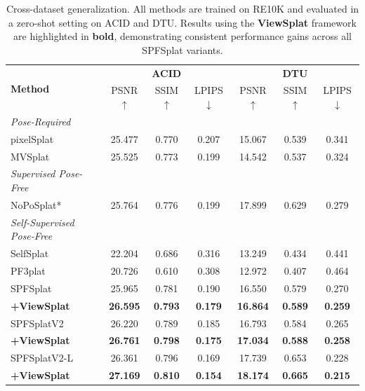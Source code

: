 \documentclass[runningheads]{llncs}
\begin{document}
\begin{table}
    \centering
\caption{Cross-dataset generalization. All methods are trained on RE10K and evaluated in a zero-shot setting on ACID and DTU. Results using the \textbf{ViewSplat} framework are highlighted in \textbf{bold}, demonstrating consistent performance gains across all SPFSplat variants.}
\vspace{-0.3cm}
\label{tab:cross-dataset}

\setlength{\tabcolsep}{5pt}
\begin{scriptsize}
    \begin{tabular}{l ccc ccc}
        \toprule
        \multirow{2}{*}{\textbf{Method}} & \multicolumn{3}{c}{\textbf{ACID}} & \multicolumn{3}{c}{\textbf{DTU}} \\
            & PSNR$\uparrow$ & SSIM$\uparrow$ & LPIPS$\downarrow$ & PSNR$\uparrow$ & SSIM$\uparrow$ & LPIPS$\downarrow$ \\ \midrule
        \textit{Pose-Required} & & & & & & \\
        pixelSplat & 25.477 & 0.770 & 0.207 & 15.067 & 0.539 & 0.341 \\
        MVSplat & 25.525 & 0.773 & 0.199 & 14.542 & 0.537 & 0.324 \\ \midrule
        \textit{Supervised Pose-Free} & & & & & & \\
        NoPoSplat* & 25.764 & 0.776 & 0.199 & 17.899 & 0.629 & 0.279 \\ \midrule
        \textit{Self-Supervised Pose-Free} & & & & & & \\
        SelfSplat & 22.204 & 0.686 & 0.316 & 13.249 & 0.434 & 0.441 \\
        PF3plat & 20.726 & 0.610 & 0.308 & 12.972 & 0.407 & 0.464 \\ \midrule
        SPFSplat & 25.965 & 0.781 & 0.190 & 16.550 & 0.579 & 0.270 \\
        \textbf{+ViewSplat} & \textbf{26.595} & \textbf{0.793} & \textbf{0.179} & \textbf{16.864} & \textbf{0.589} & \textbf{0.259} \\ \midrule
        SPFSplatV2 & 26.220 & 0.789 & 0.185 & 16.793 & 0.584 & 0.265 \\
        \textbf{+ViewSplat} & \textbf{26.761} & \textbf{0.798} & \textbf{0.175} & \textbf{17.034} & \textbf{0.588} & \textbf{0.258} \\ \midrule
        SPFSplatV2-L & 26.361 & 0.796 & 0.169 & 17.739 & 0.653 & 0.228 \\
        \textbf{+ViewSplat} & \textbf{27.169} & \textbf{0.810} & \textbf{0.154} & \textbf{18.174} & \textbf{0.665} & \textbf{0.215} \\ \bottomrule
    \end{tabular}
\end{scriptsize}
\vspace{-0.6cm}
\end{table}
\end{document}
